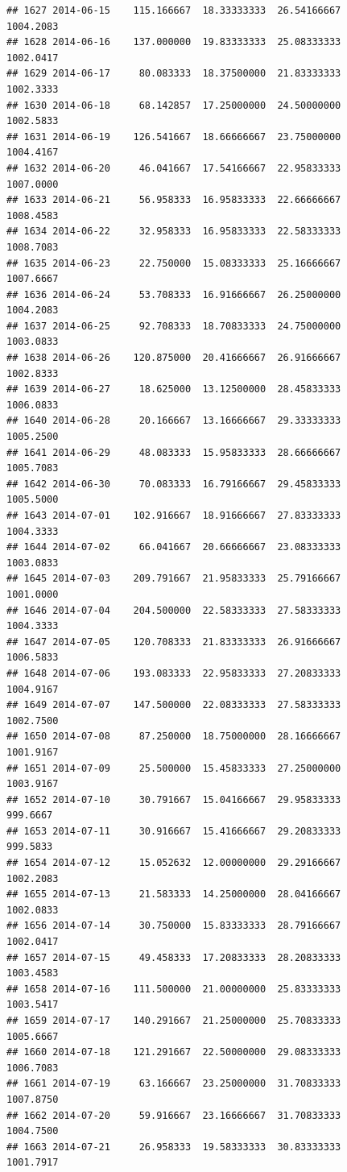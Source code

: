 \documentclass[
]{article}
\begin{document}
\begin{verbatim}
## 1627 2014-06-15    115.166667  18.33333333  26.54166667    1004.2083
## 1628 2014-06-16    137.000000  19.83333333  25.08333333    1002.0417
## 1629 2014-06-17     80.083333  18.37500000  21.83333333    1002.3333
## 1630 2014-06-18     68.142857  17.25000000  24.50000000    1002.5833
## 1631 2014-06-19    126.541667  18.66666667  23.75000000    1004.4167
## 1632 2014-06-20     46.041667  17.54166667  22.95833333    1007.0000
## 1633 2014-06-21     56.958333  16.95833333  22.66666667    1008.4583
## 1634 2014-06-22     32.958333  16.95833333  22.58333333    1008.7083
## 1635 2014-06-23     22.750000  15.08333333  25.16666667    1007.6667
## 1636 2014-06-24     53.708333  16.91666667  26.25000000    1004.2083
## 1637 2014-06-25     92.708333  18.70833333  24.75000000    1003.0833
## 1638 2014-06-26    120.875000  20.41666667  26.91666667    1002.8333
## 1639 2014-06-27     18.625000  13.12500000  28.45833333    1006.0833
## 1640 2014-06-28     20.166667  13.16666667  29.33333333    1005.2500
## 1641 2014-06-29     48.083333  15.95833333  28.66666667    1005.7083
## 1642 2014-06-30     70.083333  16.79166667  29.45833333    1005.5000
## 1643 2014-07-01    102.916667  18.91666667  27.83333333    1004.3333
## 1644 2014-07-02     66.041667  20.66666667  23.08333333    1003.0833
## 1645 2014-07-03    209.791667  21.95833333  25.79166667    1001.0000
## 1646 2014-07-04    204.500000  22.58333333  27.58333333    1004.3333
## 1647 2014-07-05    120.708333  21.83333333  26.91666667    1006.5833
## 1648 2014-07-06    193.083333  22.95833333  27.20833333    1004.9167
## 1649 2014-07-07    147.500000  22.08333333  27.58333333    1002.7500
## 1650 2014-07-08     87.250000  18.75000000  28.16666667    1001.9167
## 1651 2014-07-09     25.500000  15.45833333  27.25000000    1003.9167
## 1652 2014-07-10     30.791667  15.04166667  29.95833333     999.6667
## 1653 2014-07-11     30.916667  15.41666667  29.20833333     999.5833
## 1654 2014-07-12     15.052632  12.00000000  29.29166667    1002.2083
## 1655 2014-07-13     21.583333  14.25000000  28.04166667    1002.0833
## 1656 2014-07-14     30.750000  15.83333333  28.79166667    1002.0417
## 1657 2014-07-15     49.458333  17.20833333  28.20833333    1003.4583
## 1658 2014-07-16    111.500000  21.00000000  25.83333333    1003.5417
## 1659 2014-07-17    140.291667  21.25000000  25.70833333    1005.6667
## 1660 2014-07-18    121.291667  22.50000000  29.08333333    1006.7083
## 1661 2014-07-19     63.166667  23.25000000  31.70833333    1007.8750
## 1662 2014-07-20     59.916667  23.16666667  31.70833333    1004.7500
## 1663 2014-07-21     26.958333  19.58333333  30.83333333    1001.7917

\end{verbatim}
\end{document}
